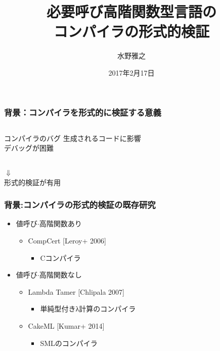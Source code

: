 \documentclass[dvipdfmx,cjk,xcolor=dvipsnames,envcountsect,notheorems,12pt]{beamer}
\title{必要呼び高階関数型言語の\\コンパイラの形式的検証}
\author{水野雅之}
\institute[東北大学 住井・松田研]{大学院情報科学研究科\\住井・松田研究室}%
\date{2017年2月17日}
\theoremstyle{definition}
\begin{document}
\frame[plain]{\titlepage}%

\begin{frame}
	\frametitle{背景：コンパイラを形式的に検証する意義}
	\begin{center}
		\LARGE 
		\begin{columns}
			\begin{column}{0.75\textwidth}
				\begin{itembox}[c]{コンパイラのバグ}
					生成されるコードに影響\\
					デバッグが困難
				\end{itembox}
			\end{column}
		\end{columns}
		$\Downarrow$\\
		形式的検証が有用
	\end{center}
\end{frame}

\begin{frame}
	\frametitle{背景:コンパイラの形式的検証の既存研究}
	\begin{itemize}
		\item \alert{値呼び}$\cdot$高階関数あり
			\begin{itemize}
				\item CompCert [Leroy+ 2006]
					\begin{itemize}
						\item Cコンパイラ
					\end{itemize}
			\end{itemize}
		\item \alert{値呼び}$\cdot$高階関数なし
			\begin{itemize}
				\item Lambda Tamer [Chlipala 2007]
					\begin{itemize}
						\item 単純型付きλ計算のコンパイラ
					\end{itemize}
				\item CakeML [Kumar+ 2014]
					\begin{itemize}
						\item SMLのコンパイラ
					\end{itemize}
			\end{itemize}
	\end{itemize}
\end{frame}
\end{document}
